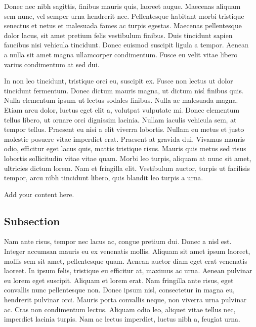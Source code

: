 Donec nec nibh sagittis, finibus mauris quis, laoreet augue. Maecenas aliquam sem nunc, vel semper urna hendrerit nec. Pellentesque habitant morbi tristique senectus et netus et malesuada fames ac turpis egestas. Maecenas pellentesque dolor lacus, sit amet pretium felis vestibulum finibus. Duis tincidunt sapien faucibus nisi vehicula tincidunt. Donec euismod suscipit ligula a tempor. Aenean a nulla sit amet magna ullamcorper condimentum. Fusce eu velit vitae libero varius condimentum at sed dui.

In non leo tincidunt, tristique orci eu, suscipit ex. Fusce non lectus ut dolor tincidunt fermentum. Donec dictum mauris magna, ut dictum nisl finibus quis. Nulla elementum ipsum ut lectus sodales finibus. Nulla ac malesuada magna. Etiam arcu dolor, luctus eget elit a, volutpat vulputate mi. Donec elementum tellus libero, ut ornare orci dignissim lacinia. Nullam iaculis vehicula sem, at tempor tellus. Praesent eu nisi a elit viverra lobortis. Nullam eu metus et justo molestie posuere vitae imperdiet erat. Praesent at gravida dui. Vivamus mauris odio, efficitur eget lacus quis, mattis tristique risus. Mauris quis metus sed risus lobortis sollicitudin vitae vitae quam. Morbi leo turpis, aliquam at nunc sit amet, ultricies dictum lorem. Nam et fringilla elit. Vestibulum auctor, turpis ut facilisis tempor, arcu nibh tincidunt libero, quis blandit leo turpis a urna.

Add your content here.


\subsection{Subsection}
Nam ante risus, tempor nec lacus ac, congue pretium dui. Donec a nisl est. Integer accumsan mauris eu ex venenatis mollis. Aliquam sit amet ipsum laoreet, mollis sem sit amet, pellentesque quam. Aenean auctor diam eget erat venenatis laoreet. In ipsum felis, tristique eu efficitur at, maximus ac urna. Aenean pulvinar eu lorem eget suscipit. Aliquam et lorem erat. Nam fringilla ante risus, eget convallis nunc pellentesque non. Donec ipsum nisl, consectetur in magna eu, hendrerit pulvinar orci. Mauris porta convallis neque, non viverra urna pulvinar ac. Cras non condimentum lectus. Aliquam odio leo, aliquet vitae tellus nec, imperdiet lacinia turpis. Nam ac lectus imperdiet, luctus nibh a, feugiat urna.

